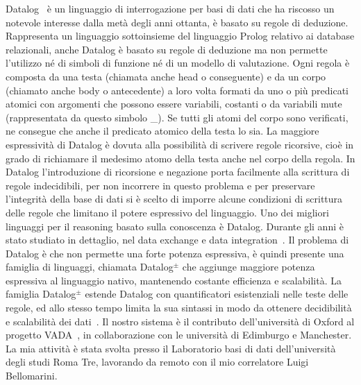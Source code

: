 Datalog~\cite{atzeni2006basi} è un linguaggio di interrogazione per basi di dati che ha riscosso un notevole interesse dalla metà degli anni ottanta, è basato su regole di deduzione. Rappresenta un linguaggio sottoinsieme del linguaggio Prolog relativo ai database relazionali, anche Datalog è basato su regole di deduzione ma non permette l'utilizzo né di simboli di funzione né di un modello di valutazione. \newline
Ogni regola è composta da una testa (chiamata anche head o conseguente) e da un corpo (chiamato anche body o antecedente) a loro volta formati da uno o più predicati atomici con argomenti che possono essere variabili, costanti o da variabili mute (rappresentata da questo simbolo \_). Se tutti gli atomi del corpo sono verificati, ne consegue che anche il predicato atomico della testa lo sia. La maggiore espressività di Datalog è dovuta alla possibilità di scrivere regole ricorsive, cioè in grado di richiamare il medesimo atomo della testa anche nel corpo della regola. \newline
In Datalog l'introduzione di ricorsione e negazione porta facilmente alla scrittura di regole indecidibili, per non incorrere in questo problema e per preservare l'integrità della base di dati si è scelto di imporre alcune condizioni di scrittura delle regole che limitano il potere espressivo del linguaggio. \newline 
Uno dei migliori linguaggi per il reasoning basato sulla conoscenza è Datalog. Durante gli anni è stato studiato in dettaglio, nel data exchange e data integration~\cite{furche2016data}. \newline
Il problema di Datalog è che non permette una forte potenza espressiva, è quindi presente una famiglia di linguaggi, chiamata Datalog$^\pm$ che aggiunge maggiore potenza espressiva al linguaggio nativo, mantenendo costante efficienza e scalabilità. \newline 
La famiglia Datalog$^\pm$ estende Datalog con quantificatori esistenziali nelle teste delle regole, ed allo stesso tempo limita la sua sintassi in modo da ottenere decidibilità e scalabilità dei dati~\cite{cali2013taming,cali2012towards,cali2010datalog+}.  \newline \newline
Il nostro sistema è il contributo dell'università di Oxford al progetto VADA~\cite{VADA}, in collaborazione con le università di Edimburgo e Manchester. La mia attività è stata svolta presso il Laboratorio basi di dati dell'università degli studi Roma Tre, lavorando da remoto con il mio correlatore Luigi Bellomarini. \newline
